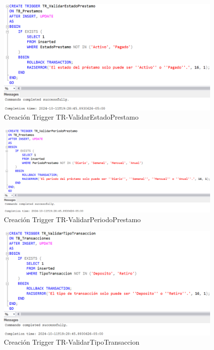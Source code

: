 \begin{figure}[H]
  \centering
  \includegraphics[scale = 0.5]{Imagenes/SQL/3.Triggers/TR_ValidarEstadoPrestamo.png}
  \caption{Creación Trigger TR-ValidarEstadoPrestamo}
\end{figure}

\begin{figure}[H]
  \centering
  \includegraphics[scale = 0.4]{Imagenes/SQL/3.Triggers/TR_ValidarPeriodoPrestamo.png}
  \caption{Creación Trigger TR-ValidarPeriodoPrestamo}
\end{figure}

\begin{figure}[H]
  \centering
  \includegraphics[scale = 0.4]{Imagenes/SQL/3.Triggers/TR_ValidarTipoTransaccion.png}
  \caption{Creación Trigger TR-ValidarTipoTransaccion}
\end{figure}

